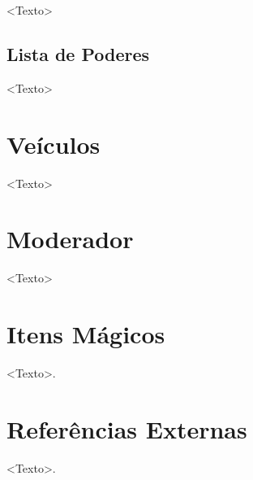 \documentclass[a4paper, twocolumn, 10pt]{book}
\begin{document}
<Texto>

\section{Lista de Poderes}

<Texto>

\chapter{Veículos}

<Texto>

\chapter{Moderador}

<Texto>

\appendix

\chapter{Itens Mágicos}

<Texto>.

\chapter{Referências Externas}

<Texto>.
\end{document}
